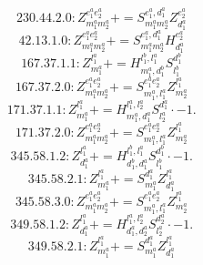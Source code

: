 \documentclass[letterpaper,10pt,fleqn,leqno,onecolumn]{article}
\begin{document}
\begin{equation} \;\;\;\;\;\;  230.44.2.0: Z^{e_{1}^{a}e_{2}^{a}}_{m_{1}^{a}m_{2}^{a}}+=S^{e_{1}^{a},d_{1}^{a}}_{m_{1}^{a}m_{2}^{a}}Z^{e_{2}^{a}}_{d_{1}^{a}} \end{equation}
\begin{equation} \;\;\;\;\;\;  42.13.1.0: Z^{e_{1}^{a}e_{2}^{a}}_{m_{1}^{a}m_{2}^{a}}+=S^{e_{1}^{a},d_{1}^{a}}_{m_{1}^{a}m_{2}^{a}}H^{e_{2}^{a}}_{d_{1}^{a}} \end{equation}
\begin{equation} \;\;\;\;\;\;  167.37.1.1: Z^{l_{1}^{a}}_{m_{1}^{a}}+=H^{l_{1}^{b},l_{1}^{a}}_{m_{1}^{a},d_{1}^{b}}S^{d_{1}^{b}}_{l_{1}^{b}} \end{equation}
\begin{equation} \;\;\;\;\;\;  167.37.2.0: Z^{e_{1}^{a}e_{2}^{a}}_{m_{1}^{a}m_{2}^{a}}+=S^{e_{1}^{a}e_{2}^{a}}_{m_{1}^{a},l_{1}^{a}}Z^{l_{1}^{a}}_{m_{2}^{a}} \end{equation}
\begin{equation} \;\;\;\;\;\;  171.37.1.1: Z^{l_{1}^{a}}_{m_{1}^{a}}+=H^{l_{1}^{a},l_{2}^{a}}_{m_{1}^{a},d_{1}^{a}}S^{d_{1}^{a}}_{l_{2}^{a}}\cdot -1. \end{equation}
\begin{equation} \;\;\;\;\;\;  171.37.2.0: Z^{e_{1}^{a}e_{2}^{a}}_{m_{1}^{a}m_{2}^{a}}+=S^{e_{1}^{a}e_{2}^{a}}_{m_{1}^{a},l_{1}^{a}}Z^{l_{1}^{a}}_{m_{2}^{a}} \end{equation}
\begin{equation} \;\;\;\;\;\;  345.58.1.2: Z^{l_{1}^{a}}_{d_{1}^{a}}+=H^{l_{1}^{b},l_{1}^{a}}_{d_{1}^{b},d_{1}^{a}}S^{d_{1}^{b}}_{l_{1}^{b}}\cdot -1. \end{equation}
\begin{equation} \;\;\;\;\;\;  345.58.2.1: Z^{l_{1}^{a}}_{m_{1}^{a}}+=S^{d_{1}^{a}}_{m_{1}^{a}}Z^{l_{1}^{a}}_{d_{1}^{a}} \end{equation}
\begin{equation} \;\;\;\;\;\;  345.58.3.0: Z^{e_{1}^{a}e_{2}^{a}}_{m_{1}^{a}m_{2}^{a}}+=S^{e_{1}^{a}e_{2}^{a}}_{m_{1}^{a},l_{1}^{a}}Z^{l_{1}^{a}}_{m_{2}^{a}} \end{equation}
\begin{equation} \;\;\;\;\;\;  349.58.1.2: Z^{l_{1}^{a}}_{d_{1}^{a}}+=H^{l_{1}^{a},l_{2}^{a}}_{d_{1}^{a},d_{2}^{a}}S^{d_{2}^{a}}_{l_{2}^{a}}\cdot -1. \end{equation}
\begin{equation} \;\;\;\;\;\;  349.58.2.1: Z^{l_{1}^{a}}_{m_{1}^{a}}+=S^{d_{1}^{a}}_{m_{1}^{a}}Z^{l_{1}^{a}}_{d_{1}^{a}} \end{equation}
\end{document}
